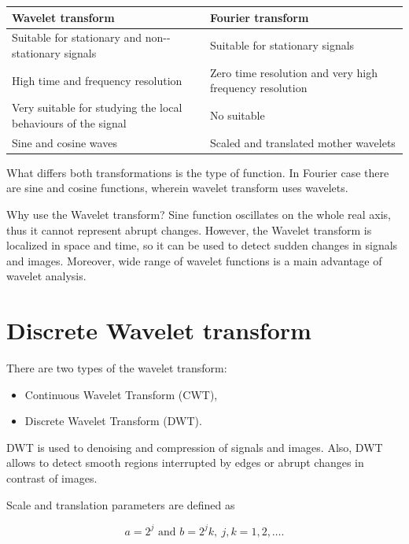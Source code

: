 \begin{table}[h]
\centering

\label{The diferrences between Wavelet Transform and Fourier Transform.}
\begin{tabular}{|p{0.5\linewidth}|p{0.5\linewidth}|}
\toprule
\textbf{ Wavelet transform} & \textbf{Fourier transform}
\\ \midrule
Suitable for stationary and non-\allowbreak -stationary signals 
& Suitable for stationary signals 
\\ \midrule
High time and frequency resolution
& Zero time resolution and very high frequency resolution     
\\ \midrule
Very suitable for studying the local behaviours of the signal
& No suitable  
\\ \midrule
Sine and cosine waves
& Scaled and translated mother wavelets
\\ \bottomrule
\end{tabular}
\end{table}

What differs both transformations is the type of function. In Fourier case there are sine and cosine functions, wherein wavelet transform uses wavelets.

Why use the Wavelet transform?
Sine function oscillates on the whole real axis, thus it cannot represent abrupt changes. However, the Wavelet transform is localized in space and time, so it can be used to detect sudden changes in signals and images. Moreover, wide range of wavelet functions is a main advantage of wavelet analysis.

\section{Discrete Wavelet transform}
There are two types of the wavelet transform:
\begin{itemize}
\item Continuous Wavelet Transform (CWT),
\item Discrete Wavelet Transform (DWT).
\end{itemize}

DWT is used to denoising and compression of signals and images. Also, DWT allows to detect smooth regions interrupted by edges or abrupt changes in contrast of images.

Scale and translation parameters are defined as

\begin{equation}
a = 2^j \text{ and } b = 2^j k,\ j,k=1,2,\ldots.
\end{equation}

